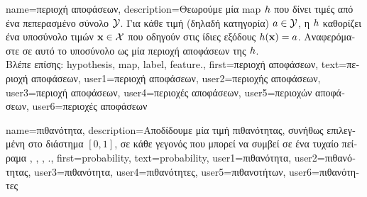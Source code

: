 {name={\foreignlanguage{greek}{περιοχή αποφάσεων}}, 
	description={\foreignlanguage{greek}{Θεωρούμε μία} \gls{map} 
		 $h$ \foreignlanguage{greek}{που δίνει τιμές από ένα πεπερασμένο σύνολο $\mathcal{Y}$. 
		Για κάθε τιμή}  \foreignlanguage{greek}{(δηλαδή κατηγορία) $a \in \mathcal{Y}$, η}  $h$ 
		\foreignlanguage{greek}{καθορίζει ένα υποσύνολο τιμών}  ${\bf x} \in \mathcal{X}$ \foreignlanguage{greek}{που  
		οδηγούν στις ίδιες εξόδους $h({\bf x})=a$. Αναφερόμαστε σε αυτό το υποσύνολο ως μία περιοχή αποφάσεων  
		της}  $h$.\\
		\foreignlanguage{greek}{Βλέπε επίσης:} \gls{hypothesis}, \gls{map}, \gls{label}, \gls{feature}.},
	first={\foreignlanguage{greek}{περιοχή αποφάσεων}},
	text={\foreignlanguage{greek}{περιοχή αποφάσεων}},
	user1={\foreignlanguage{greek}{περιοχή αποφάσεων}}, %
	user2={\foreignlanguage{greek}{περιοχής αποφάσεων}}, %
	user3={\foreignlanguage{greek}{περιοχή αποφάσεων}}, %
	user4={\foreignlanguage{greek}{περιοχές αποφάσεων}}, %
	user5={\foreignlanguage{greek}{περιοχών αποφάσεων}}, %
	user6={\foreignlanguage{greek}{περιοχές αποφάσεων}} %
}

{name={\foreignlanguage{greek}{πιθανότητα}},
	description={\foreignlanguage{greek}{Αποδίδουμε} \foreignlanguage{greek}{μία τιμή 
		πιθανότητας, συνήθως επιλεγμένη στο διάστημα $[0,1]$, σε κάθε γεγονός που μπορεί να συμβεί σε ένα τυχαίο 
		πεί\-ραμα} \cite{BillingsleyProbMeasure}, \cite{BertsekasProb}, \cite{HalmosMeasure}, \cite{KallenbergBook}.},
	first={probability},
	text={probability},
	user1={\foreignlanguage{greek}{πιθανότητα}}, %
    	user2={\foreignlanguage{greek}{πιθανότητας}}, %
	user3={\foreignlanguage{greek}{πιθανότητα}}, %
	user4={\foreignlanguage{greek}{πιθανότητες}}, %
    	user5={\foreignlanguage{greek}{πιθανοτήτων}}, %
	user6={\foreignlanguage{greek}{πιθανότητες}} %
}

